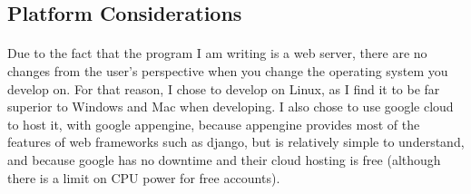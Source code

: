 \subsection{Platform Considerations}
\paragraph{}
Due to the fact that the program I am writing is a web server, there are no changes from the user's perspective when you change the operating system you develop on. For that reason, I chose to develop on Linux, as I find it to be far superior to Windows and Mac when developing. I also chose to use google cloud to host it, with google appengine, because appengine provides most of the features of web frameworks such as django, but is relatively simple to understand, and because google has no downtime and their cloud hosting is free (although there is a limit on CPU power for free accounts).